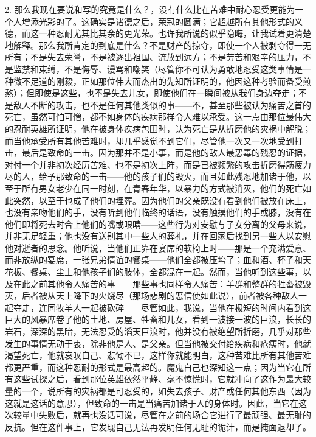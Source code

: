 2. 那么我现在要说和写的究竟是什么？，没有什么比在苦难中耐心忍受更能为一个人增添光彩的了。这确实是诸德之后，荣冠的圆满；它超越所有其他形式的义德，而这一种忍耐尤其比其余的更光荣。也许我所说的似乎隐晦，让我试着更清楚地解释。那么我所肯定的到底是什么？不是财产的掠夺，即使一个人被剥夺得一无所有；不是失去荣誉，不是被逐出祖国、流放到远方；不是劳苦和艰辛的压力，不是监禁和束缚，不是侮辱、谩骂和嘲笑（尽管你不可认为勇敢地忍受这类事情是一种微不足道的刚毅，正如那位伟大而杰出的先知所证明的，他因这种考验而备受煎熬）；但即使是这些，也不是失去儿女，即使他们在一瞬间被从我们身边夺走；不是敌人不断的攻击，也不是任何其他类似的事——不，甚至那些被认为痛苦之首的死亡，虽然可怕可憎，都不如身体的疾病那样令人难以承受。这一点由那位最伟大的忍耐英雄所证明，他在被身体疾病包围时，认为死亡是从折磨他的灾祸中解脱；而当他承受所有其他苦难时，却几乎感觉不到它们，尽管他一次又一次地受到打击，最后是致命的一击。因为那并不是小事，而是他的敌人最恶毒的残忍的证据，对付一个并非初次经历苦难、也不是初次上阵，而是已被频繁的攻击折磨得筋疲力尽的人，给予那致命的一击——他的孩子们的毁灭，而且如此残忍地加诸于他，以至于所有男女老少在同一时刻，在青春年华，以暴力的方式被消灭，他们的死亡如此突然，以至于也成了他们的埋葬。因为他们的父亲既没有看到他们被放在床上，也没有亲吻他们的手，没有听到他们临终的话语，没有触摸他们的手或膝，没有在他们即将死去时合上他们的嘴或眼睛——这些行为对安慰与子女分离的父母来说，并非无足轻重；他也没有送别其中一些人的葬礼，并在回家后找到另一些人以安慰他对逝者的思念。他听说，当他们正靠在宴席的软椅上时——那是一个充满爱意、而非放纵的宴席，一张兄弟情谊的餐桌——他们全都被压垮了；血和酒、杯子和天花板、餐桌、尘土和他孩子们的肢体，全都混在一起。然而，当他听到这些事，以及在此之前其他令人痛苦的事——那些事也同样令人痛苦：羊群和整群的牲畜被毁灭，后者被从天上降下的火烧尽（那场悲剧的恶信使如此说），前者被各种敌人一起夺走，连同牧羊人一起被砍碎——尽管如此，我说，当他在极短的时间内看到这巨大的风暴席卷了他的土地、房屋、牲畜和儿女，看到一波接一波的巨浪，长长的岩石，深深的黑暗，无法忍受的滔天巨浪时，他并没有被绝望所折磨，几乎对那些发生的事情无动于衷，除非他是人、是父亲。但当他被交付给疾病和疮痍时，他就渴望死亡，他就哀叹自己、悲恸不已，这样你就能明白，这种苦难比所有其他苦难都更严重，而这种忍耐的形式是最高超的。魔鬼自己也深知这一点；因为当它在所有这些试探之后，看到那位英雄依然平静、毫不惊慌时，它就冲向了这作为最大较量的一个，说所有的灾祸都是可忍受的，如失去孩子、财产或任何其他东西（因为这就是这话的意思），但致命的一击是当痛苦加诸于人的身体时。因此，当它在这次较量中失败后，就再也没话可说，尽管在之前的场合它进行了最顽强、最无耻的反抗。但在这件事上，它发现自己无法再发明任何无耻的诡计，而是掩面退却了。\par

